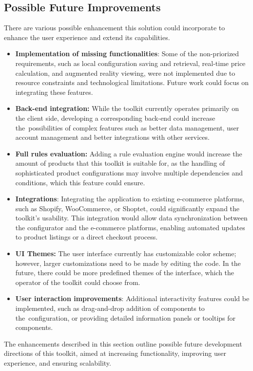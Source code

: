 \subsection{Possible Future Improvements} \label{section:improvements}

There are various possible enhancement this solution could incorporate to enhance the user experience and extend its capabilities.

\begin{itemize}[label=\rectanglebullet]
    \item \textbf{Implementation of missing functionalities}: Some of the non-priorized requirements, such as local configuration saving and retrieval, real-time price calculation, and augmented reality viewing, were not implemented due to resource constraints and technological limitations. Future work could focus on integrating these features.
    \item \textbf{Back-end integration:} While the toolkit currently operates primarily on the client side, developing a corresponding back-end could increase the~possibilities of complex features such as better data management, user account management and better integrations with other services.
    \item \textbf{Full rules evaluation:} Adding a rule evaluation engine would increase the amount of products that this toolkit is suitable for, as the handling of sophisticated product configurations may involve multiple dependencies and conditions, which this feature could ensure.
    \item \textbf{Integrations}: Integrating the application to existing e-commerce platforms, such as Shopify, WooCommerce, or Shoptet, could significantly expand the toolkit's usability. This integration would allow data synchronization between the configurator and the e-commerce platforms, enabling automated updates to product listings or a direct checkout process.
    \item \textbf{UI Themes:} The user interface currently has customizable color scheme; however, larger customizations need to be made by editing the  code. In the future, there could be more predefined themes of the interface, which the operator of the toolkit could choose from.
    \item \textbf{User interaction improvements}: Additional interactivity features could be implemented, such as drag-and-drop addition of components to the~configuration, or providing detailed information panels or tooltips for components.
\end{itemize}

The enhancements described in this section outline possible future development directions of this toolkit, aimed at increasing functionality, improving user experience, and ensuring scalability.